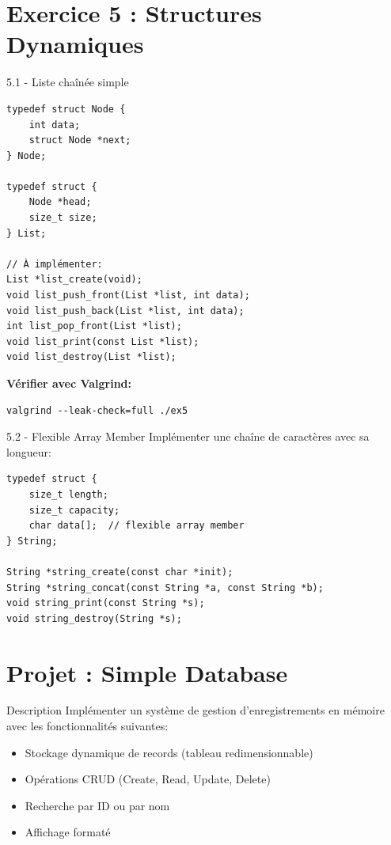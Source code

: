 \documentclass[10pt,a4paper]{article}
\begin{document}
\section{Exercice 5 : Structures Dynamiques}

\begin{exercicebox}{5.1 - Liste chaînée simple}
\begin{lstlisting}
typedef struct Node {
    int data;
    struct Node *next;
} Node;

typedef struct {
    Node *head;
    size_t size;
} List;

// À implémenter:
List *list_create(void);
void list_push_front(List *list, int data);
void list_push_back(List *list, int data);
int list_pop_front(List *list);
void list_print(const List *list);
void list_destroy(List *list);
\end{lstlisting}

\textbf{Vérifier avec Valgrind:}
\begin{verbatim}
valgrind --leak-check=full ./ex5
\end{verbatim}
\end{exercicebox}

\begin{exercicebox}{5.2 - Flexible Array Member}
Implémenter une chaîne de caractères avec sa longueur:

\begin{lstlisting}
typedef struct {
    size_t length;
    size_t capacity;
    char data[];  // flexible array member
} String;

String *string_create(const char *init);
String *string_concat(const String *a, const String *b);
void string_print(const String *s);
void string_destroy(String *s);
\end{lstlisting}
\end{exercicebox}

\section{Projet : Simple Database}

\begin{techbox}{Description}
Implémenter un système de gestion d'enregistrements en mémoire avec les fonctionnalités suivantes:
\begin{itemize}
\item Stockage dynamique de records (tableau redimensionnable)
\item Opérations CRUD (Create, Read, Update, Delete)
\item Recherche par ID ou par nom
\item Affichage formaté
\end{itemize}
\end{techbox}
\end{document}
